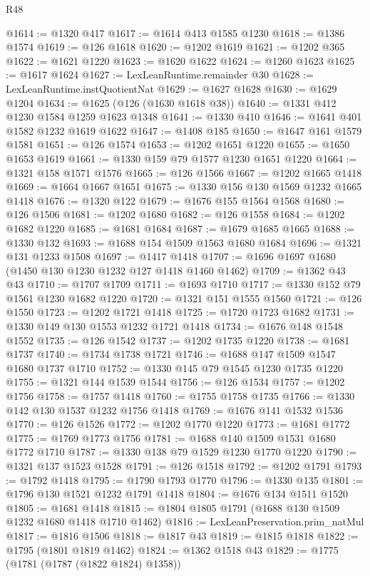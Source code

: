 \begin{lexlean}{R48}
\begin{coremodule}
@1614 := @1320 @417
@1617 := @1614 @413 @1585 @1230
@1618 := @1386 @1574
@1619 := @126 @1618
@1620 := @1202 @1619
@1621 := @1202 @365
@1622 := @1621 @1220
@1623 := @1620 @1622
@1624 := @1260 @1623
@1625 := @1617 @1624
@1627 := LexLeanRuntime.remainder @30
@1628 := LexLeanRuntime.instQuotientNat
@1629 := @1627 @1628
@1630 := @1629 @1204
@1634 := @1625 (@126 (@1630 @1618 @38))
@1640 := @1331 @412 @1230 @1584 @1259 @1623 @1348
@1641 := @1330 @410
@1646 := @1641 @401 @1582 @1232 @1619 @1622
@1647 := @1408 @185
@1650 := @1647 @161 @1579 @1581
@1651 := @126 @1574
@1653 := @1202 @1651 @1220
@1655 := @1650 @1653 @1619
@1661 := @1330 @159 @79 @1577 @1230 @1651 @1220
@1664 := @1321 @158 @1571 @1576
@1665 := @126 @1566
@1667 := @1202 @1665 @1418
@1669 := @1664 @1667 @1651
@1675 := @1330 @156 @130 @1569 @1232 @1665 @1418
@1676 := @1320 @122
@1679 := @1676 @155 @1564 @1568
@1680 := @126 @1506
@1681 := @1202 @1680
@1682 := @126 @1558
@1684 := @1202 @1682 @1220
@1685 := @1681 @1684
@1687 := @1679 @1685 @1665
@1688 := @1330 @132
@1693 := @1688 @154 @1509 @1563 @1680 @1684
@1696 := @1321 @131 @1233 @1508
@1697 := @1417 @1418
@1707 := @1696 @1697 @1680 (@1450 @130 @1230 @1232 @127 @1418 @1460 @1462)
@1709 := @1362 @43 @43
@1710 := @1707 @1709
@1711 := @1693 @1710
@1717 := @1330 @152 @79 @1561 @1230 @1682 @1220
@1720 := @1321 @151 @1555 @1560
@1721 := @126 @1550
@1723 := @1202 @1721 @1418
@1725 := @1720 @1723 @1682
@1731 := @1330 @149 @130 @1553 @1232 @1721 @1418
@1734 := @1676 @148 @1548 @1552
@1735 := @126 @1542
@1737 := @1202 @1735 @1220
@1738 := @1681 @1737
@1740 := @1734 @1738 @1721
@1746 := @1688 @147 @1509 @1547 @1680 @1737 @1710
@1752 := @1330 @145 @79 @1545 @1230 @1735 @1220
@1755 := @1321 @144 @1539 @1544
@1756 := @126 @1534
@1757 := @1202 @1756
@1758 := @1757 @1418
@1760 := @1755 @1758 @1735
@1766 := @1330 @142 @130 @1537 @1232 @1756 @1418
@1769 := @1676 @141 @1532 @1536
@1770 := @126 @1526
@1772 := @1202 @1770 @1220
@1773 := @1681 @1772
@1775 := @1769 @1773 @1756
@1781 := @1688 @140 @1509 @1531 @1680 @1772 @1710
@1787 := @1330 @138 @79 @1529 @1230 @1770 @1220
@1790 := @1321 @137 @1523 @1528
@1791 := @126 @1518
@1792 := @1202 @1791
@1793 := @1792 @1418
@1795 := @1790 @1793 @1770
@1796 := @1330 @135
@1801 := @1796 @130 @1521 @1232 @1791 @1418
@1804 := @1676 @134 @1511 @1520
@1805 := @1681 @1418
@1815 := @1804 @1805 @1791 (@1688 @130 @1509 @1232 @1680 @1418 @1710 @1462)
@1816 := LexLeanPreservation.prim_natMul
@1817 := @1816 @1506
@1818 := @1817 @43
@1819 := @1815 @1818
@1822 := @1795 (@1801 @1819 @1462)
@1824 := @1362 @1518 @43
@1829 := @1775 (@1781 (@1787 (@1822 @1824) @1358))

\end{coremodule}
\end{lexlean}
